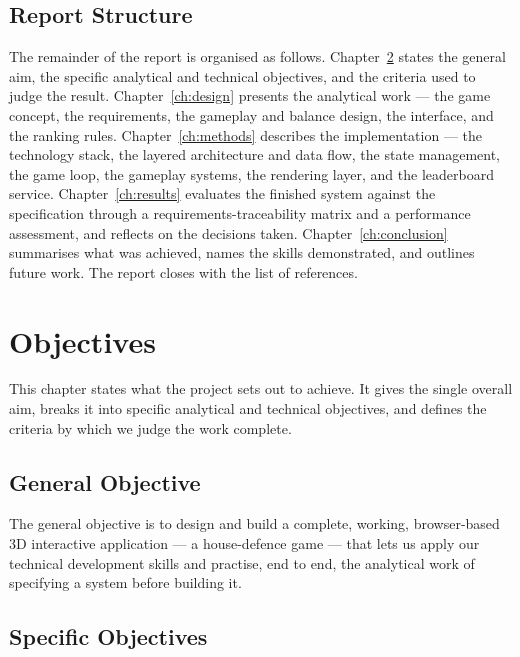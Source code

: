 \documentclass[12pt,a4paper]{report}
\begin{document}
\section{Report Structure}

The remainder of the report is organised as follows.
Chapter~\ref{ch:objectives} states the general aim, the specific analytical and
technical objectives, and the criteria used to judge the result.
Chapter~\ref{ch:design} presents the analytical work --- the game concept, the
requirements, the gameplay and balance design, the interface, and the ranking
rules. Chapter~\ref{ch:methods} describes the implementation --- the technology
stack, the layered architecture and data flow, the state management, the game
loop, the gameplay systems, the rendering layer, and the leaderboard service.
Chapter~\ref{ch:results} evaluates the finished system against the specification
through a requirements-traceability matrix and a performance assessment, and
reflects on the decisions taken. Chapter~\ref{ch:conclusion} summarises what was
achieved, names the skills demonstrated, and outlines future work. The report
closes with the list of references.

\chapter{Objectives}\label{ch:objectives}

This chapter states what the project sets out to achieve. It gives the single
overall aim, breaks it into specific analytical and technical objectives, and
defines the criteria by which we judge the work complete.

\section{General Objective}

The general objective is to design and build a complete, working,
browser-based 3D interactive application --- a house-defence game --- that lets
us apply our technical development skills and practise, end to end, the
analytical work of specifying a system before building it.

\section{Specific Objectives}
\end{document}
